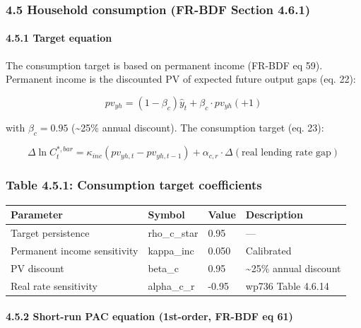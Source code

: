 \documentclass[
]{article}
\newcounter{none} %
\begin{document}
\subsubsection{4.5 Household consumption (FR-BDF Section
4.6.1)}\label{household-consumption-fr-bdf-section-4.6.1}

\paragraph{4.5.1 Target equation}\label{target-equation}

The consumption target is based on permanent income (FR-BDF eq 59).
Permanent income is the discounted PV of expected future output gaps
(eq. 22):

\[pv_{yh} = (1 - \beta_c) \hat{y}_t + \beta_c \cdot pv_{yh}(+1)\]

with \(\beta_c = 0.95\) (\textasciitilde25\% annual discount). The
consumption target (eq. 23):

\[\Delta \ln C^{*,bar}_t = \kappa_{inc} (pv_{yh,t} - pv_{yh,t-1}) + \alpha_{c,r} \cdot \Delta(\text{real lending rate gap})\]

\subsubsection{Table 4.5.1: Consumption target
coefficients}\label{table-4.5.1-consumption-target-coefficients}

{\def\LTcaptype{none} %
\begin{longtable}[]{@{}llll@{}}
\toprule\noalign{}
Parameter & Symbol & Value & Description \\
\midrule\noalign{}
\endhead
\bottomrule\noalign{}
\endlastfoot
Target persistence & rho\_c\_star & 0.95 & --- \\
Permanent income sensitivity & kappa\_inc & 0.050 & Calibrated \\
PV discount & beta\_c & 0.95 & \textasciitilde25\% annual discount \\
Real rate sensitivity & alpha\_c\_r & -0.95 & wp736 Table 4.6.14 \\
\end{longtable}
}

\paragraph{4.5.2 Short-run PAC equation (1st-order, FR-BDF eq
61)}\label{short-run-pac-equation-1st-order-fr-bdf-eq-61}
\end{document}
